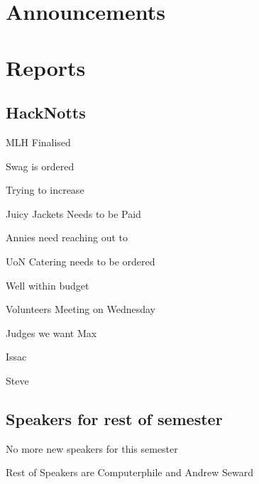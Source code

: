 \documentclass[11pt,hacksoc]{meetingmins}
\begin{document}
\maketitle

\section{Announcements}
\begin{items}
\item

\end{items}

\section{Reports}

\subsection{HackNotts}
\begin{hiddensubitems}
	\item
	MLH Finalised
	
	\item
	Swag is ordered
	
	\item
	Trying to increase 
	
	\item
	Juicy Jackets Needs to be Paid
	
	\item
	Annies need reaching out to
	
	\item
	UoN Catering needs to be ordered
	
	\item
	Well within budget
	
	\item
	Volunteers Meeting on Wednesday
	
	\item
	Judges we want
		\subitem
		Max
		
		\subitem
		Issac
		
		\subitem
		Steve

\end{hiddensubitems}

\subsection{Speakers for rest of semester}
\begin{hiddensubitems}
	\item
	No more new speakers for this semester
	
	\item
	Rest of Speakers are Computerphile and Andrew Seward
\end{hiddensubitems}
\end{document}
